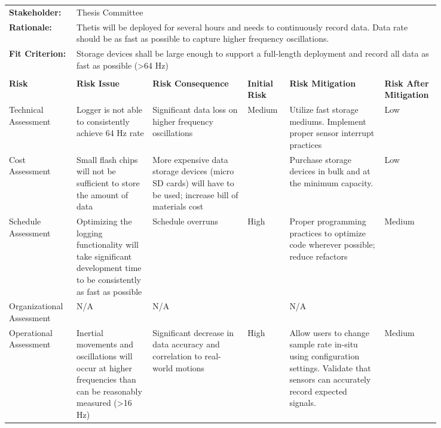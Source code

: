 \begin{landscape}
{\begin{longtable}{| p{0.12\linewidth} | p{0.16\linewidth} |  p{0.20\linewidth} | p{0.08\linewidth} | p{0.20\linewidth} | p{0.08\linewidth} |}
	\hline
	\rowcolor[gray]{0.8}
	\multicolumn{6}{|c|}{ } \\
	\hline
	\textbf{Stakeholder:} & \multicolumn{5}{|l|}{Thesis Committee} \\
	\hline
	\textbf{Rationale:} & \multicolumn{5}{|p{0.8\linewidth}|}{Thetis will be deployed for several hours and needs to continuously record data. Data rate should be as fast as possible to capture higher frequency oscillations.} \\
	\hline
	\textbf{Fit Criterion:} & \multicolumn{5}{|p{0.8\linewidth}|}{Storage devices shall be large enough to support a full-length deployment and record all data as fast as possible (\textgreater 64 Hz)} \\
	\hline
	\rowcolor[gray]{0.8}
	\multicolumn{6}{|c|}{ } \\
	\hline
	\textbf{Risk} & \textbf{Risk Issue} & \textbf{Risk Consequence} & \textbf{Initial Risk} & \textbf{Risk Mitigation} & \textbf{Risk \newline After \newline Mitigation} \\
	\hline
	Technical \newline Assessment & Logger is not able to consistently achieve 64 Hz rate & Significant data loss on higher frequency oscillations & \cellcolor{yellow} Medium & Utilize fast storage mediums. \newline Implement proper sensor interrupt practices & \cellcolor{green} Low \\
	\hline
	Cost \newline Assessment & Small flash chips will not be sufficient to store the amount of data & More expensive data storage devices (micro SD cards) will have to be used; increase bill of materials cost & \cellcolor{yellow} & Purchase storage devices in bulk and at the minimum capacity. & \cellcolor{green} Low \\
	\hline
	Schedule \newline Assessment & Optimizing the logging functionality will take significant development time to be consistently as fast as possible & Schedule overruns & \cellcolor{red} High & Proper programming practices to optimize code wherever possible; reduce refactors & \cellcolor{yellow} Medium \\
	\hline
	Organizational \newline Assessment & N/A & N/A & \cellcolor[gray]{0.8}  & N/A & \cellcolor[gray]{0.8}  \\
	\hline
	Operational \newline Assessment & Inertial movements and oscillations will occur at higher frequencies than can be reasonably measured (\textgreater 16 Hz) & Significant decrease in data accuracy and correlation to real-world motions & \cellcolor{red} High & Allow users to change sample rate in-situ using configuration settings. \newline Validate that sensors can accurately record expected signals. & \cellcolor{yellow} Medium
	\label{tab:sr09_feasibility}
\end{longtable}
}
\newpage


\end{landscape}
